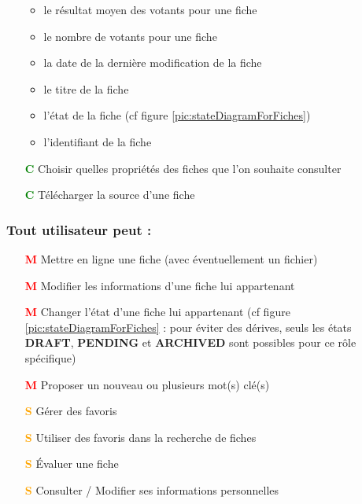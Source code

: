 \begin{itemize}
            \begin{itemize}
            \item le résultat moyen des votants pour une \gls{fiche}
            \item le nombre de votants pour une \gls{fiche}
            \item la date de la dernière modification de la \gls{fiche}
            \item le titre de la \gls{fiche}
            \item l'état de la \gls{fiche} (cf figure \ref{pic:stateDiagramForFiches})
            \item l'identifiant de la \gls{fiche}
        \end{itemize}
    \item[\textcolor{green}{\textbf{C}}] Choisir quelles propriétés des \glspl{fiche} que l'on souhaite consulter
    \item[\textcolor{green}{\textbf{C}}] Télécharger la source d'une \gls{fiche} 
\end{itemize}

\subsubsection*{Tout utilisateur peut : }
\begin{itemize}
    \item[\textcolor{red}{\textbf{M}}] Mettre en ligne une \gls{fiche}  (avec éventuellement un fichier)
    \item[\textcolor{red}{\textbf{M}}] Modifier les informations d'une \gls{fiche}  lui appartenant
    \item[\textcolor{red}{\textbf{M}}] Changer l'état d'une \gls{fiche} lui appartenant (cf figure \ref{pic:stateDiagramForFiches} : pour éviter des dérives, seuls les états \textbf{DRAFT}, \textbf{PENDING} et \textbf{ARCHIVED} sont possibles pour ce rôle spécifique)
    \item[\textcolor{red}{\textbf{M}}] Proposer un nouveau ou plusieurs mot(s) clé(s)
    \item[\textcolor{orange}{\textbf{S}}] Gérer des favoris
    \item[\textcolor{orange}{\textbf{S}}] Utiliser des favoris dans la recherche de \gls{fiche}s
    \item[\textcolor{orange}{\textbf{S}}] Évaluer une \gls{fiche}  
    \item[\textcolor{orange}{\textbf{S}}] Consulter / Modifier ses informations personnelles
\end{itemize}

